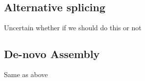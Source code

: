 \subsection{Alternative splicing}
Uncertain whether if we should do this or not
\subsection{De-novo Assembly} 
Same as above
